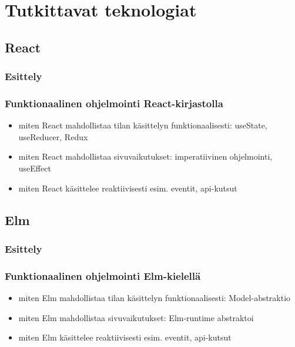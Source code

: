\chapter{Tutkittavat teknologiat}

\section{React}

\subsection{Esittely}

\subsection{Funktionaalinen ohjelmointi React-kirjastolla}

\begin{itemize}
  \item miten React mahdollistaa tilan käsittelyn funktionaalisesti: useState, useReducer, Redux
  \item miten React mahdollistaa sivuvaikutukset: imperatiivinen ohjelmointi, useEffect
  \item miten React käsittelee reaktiivisesti esim. eventit, api-kutsut
\end{itemize}

\section{Elm}

\subsection{Esittely}

\subsection{Funktionaalinen ohjelmointi Elm-kielellä}

\begin{itemize}
  \item miten Elm mahdollistaa tilan käsittelyn funktionaalisesti: Model-abstraktio
  \item miten Elm mahdollistaa sivuvaikutukset: Elm-runtime abstraktoi
  \item miten Elm käsittelee reaktiivisesti esim. eventit, api-kutsut
\end{itemize}
